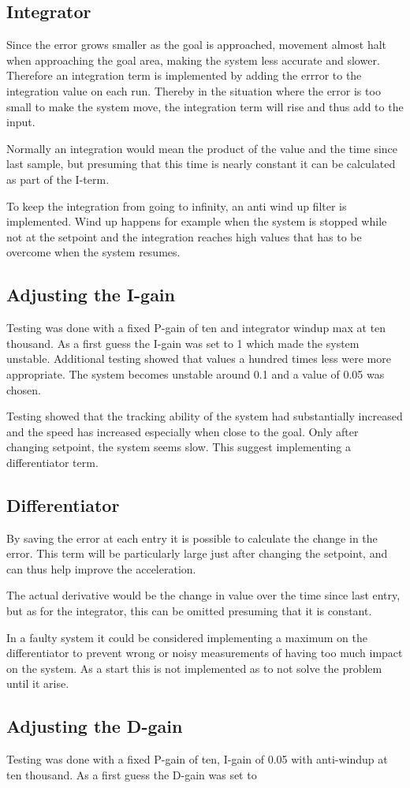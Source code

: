 \subsection{Integrator}
Since the error grows smaller as the goal is approached, movement almost halt when approaching the goal area, making the system less accurate and slower. Therefore an integration term is implemented by adding the errror to the integration value on each run. Thereby in the situation where the error is too small to make the system move, the integration term will rise and thus add to the input. 

Normally an integration would mean the product of the value and the time since last sample, but presuming that this time is nearly constant it can be calculated as part of the I-term. 

To keep the integration from going to infinity, an anti wind up filter is implemented. Wind up happens for example when the system is stopped while not at the setpoint and the integration reaches high values that has to be overcome when the system resumes.

\subsection{Adjusting the I-gain}
Testing was done with a fixed P-gain of ten and integrator windup max at ten thousand. As a first guess the I-gain was set to 1 which made the system unstable. Additional testing showed that values a hundred times less were more appropriate. The system becomes unstable around 0.1 and a value of 0.05 was chosen.

Testing showed that the tracking ability of the system had substantially increased and the speed has increased especially when close to the goal. Only after changing setpoint, the system seems slow. This suggest implementing a differentiator term.

\subsection{Differentiator}
By saving the error at each entry it is possible to calculate the change in the error. This term will be particularly large just after changing the setpoint, and can thus help improve the acceleration.

The actual derivative would be the change in value over the time since last entry, but as for the integrator, this can be omitted presuming that it is constant.

In a faulty system it could be considered implementing a maximum on the differentiator to prevent wrong or noisy measurements of having too much impact on the system. As a start this is not implemented as to not solve the problem until it arise.

\subsection{Adjusting the D-gain}
Testing was done with a fixed P-gain of ten, I-gain of 0.05 with anti-windup at ten thousand. As a first guess the D-gain was set to
